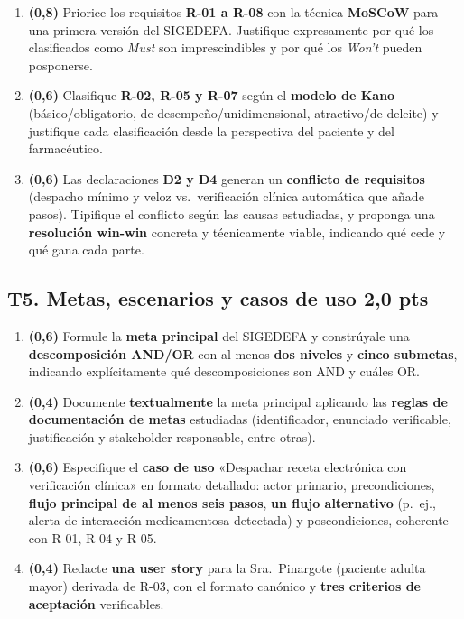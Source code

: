 \documentclass[11pt]{article}
\newcommand{\pts}[1]{\hfill{\normalsize\textbf{\textcolor{utegreendk}{#1 pts}}}}
\begin{document}
\begin{enumerate}[label=\textbf{T4.\arabic*},leftmargin=26pt,itemsep=3pt]
  \item \textbf{(0{,}8)} Priorice los requisitos \textbf{R-01 a R-08} con la técnica \textbf{MoSCoW} para una primera versión del SIGEDEFA. Justifique expresamente por qué los clasificados como \emph{Must} son imprescindibles y por qué los \emph{Won't} pueden posponerse.
  \item \textbf{(0{,}6)} Clasifique \textbf{R-02, R-05 y R-07} según el \textbf{modelo de Kano} (básico/obligatorio, de desempeño/unidimensional, atractivo/de deleite) y justifique cada clasificación desde la perspectiva del paciente y del farmacéutico.
  \item \textbf{(0{,}6)} Las declaraciones \textbf{D2 y D4} generan un \textbf{conflicto de requisitos} (despacho mínimo y veloz vs.\ verificación clínica automática que añade pasos). Tipifique el conflicto según las causas estudiadas, y proponga una \textbf{resolución win-win} concreta y técnicamente viable, indicando qué cede y qué gana cada parte.
\end{enumerate}

\subsection*{T5. Metas, escenarios y casos de uso \pts{2{,}0}}

\begin{enumerate}[label=\textbf{T5.\arabic*},leftmargin=26pt,itemsep=3pt]
  \item \textbf{(0{,}6)} Formule la \textbf{meta principal} del SIGEDEFA y constrúyale una \textbf{descomposición AND/OR} con al menos \textbf{dos niveles} y \textbf{cinco submetas}, indicando explícitamente qué descomposiciones son AND y cuáles OR.
  \item \textbf{(0{,}4)} Documente \textbf{textualmente} la meta principal aplicando las \textbf{reglas de documentación de metas} estudiadas (identificador, enunciado verificable, justificación y stakeholder responsable, entre otras).
  \item \textbf{(0{,}6)} Especifique el \textbf{caso de uso} «Despachar receta electrónica con verificación clínica» en formato detallado: actor primario, precondiciones, \textbf{flujo principal de al menos seis pasos}, \textbf{un flujo alternativo} (p.\ ej., alerta de interacción medicamentosa detectada) y poscondiciones, coherente con R-01, R-04 y R-05.
  \item \textbf{(0{,}4)} Redacte \textbf{una user story} para la Sra.\ Pinargote (paciente adulta mayor) derivada de R-03, con el formato canónico y \textbf{tres criterios de aceptación} verificables.
\end{enumerate}
\end{document}
